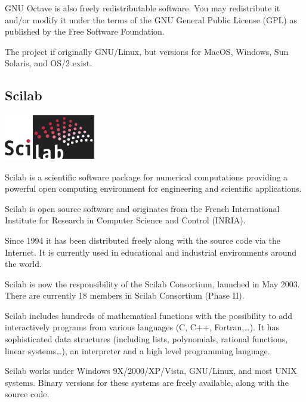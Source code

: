 GNU Octave is also freely redistributable software. You may redistribute it and/or modify it under the terms of the GNU General Public License (GPL) as published by the Free Software Foundation.

The project if originally GNU/Linux, but versions for MacOS, Windows, Sun Solaris, and OS/2 exist.

\subsection{Scilab}

\begin{floatingfigure}[r]{4cm}
\centering
\includegraphics[width=4cm]{figures/scilab_official_logo}
\end{floatingfigure}

Scilab is a scientific software package for numerical computations providing a powerful open computing environment for engineering and scientific applications.

Scilab is open source software and originates from the French International Institute for Research in Computer Science and Control (INRIA).

Since 1994 it has been distributed freely along with the source code via the Internet. It is currently used in educational and industrial environments around the world.

Scilab is now the responsibility of the Scilab Consortium, launched in May 2003. There are currently 18 members in Scilab Consortium (Phase II).

Scilab includes hundreds of mathematical functions with the possibility to add interactively programs from various languages (C, C++, Fortran,\dots). It has sophisticated data structures (including lists, polynomials, rational functions, linear systems\dots), an interpreter and a high level programming language.

Scilab works under Windows 9X/2000/XP/Vista, GNU/Linux, and most UNIX systems. Binary versions for these systems are freely available, along with the source code.